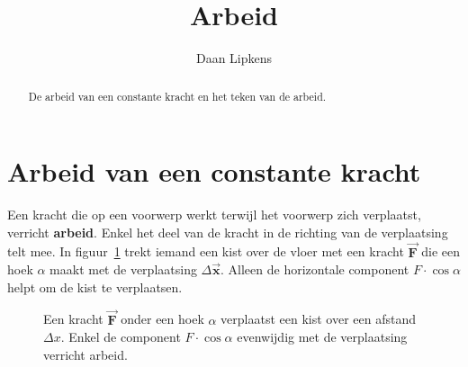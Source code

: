 \documentclass{ximera}
\title{Arbeid}
\author{Daan Lipkens}
\begin{document}
\begin{abstract}
    De arbeid van een constante kracht en het teken van de arbeid.
\end{abstract}
\maketitle
\label{app:arbeid}

\section{Arbeid van een constante kracht}\label{sec:arbeid}
Een kracht die op een voorwerp werkt terwijl het voorwerp zich verplaatst, verricht \textbf{arbeid}. Enkel het deel van de kracht in de richting van de verplaatsing telt mee. In figuur~\ref{fig:arbeid_hoek} trekt iemand een kist over de vloer met een kracht $\vec{\mathbf{F}}$ die een hoek $\alpha$ maakt met de verplaatsing $\Delta \vec{\mathbf{x}}$. Alleen de horizontale component $F \cdot \cos \alpha$ helpt om de kist te verplaatsen.

\begin{figure}[h]
    \captionsetup{width=0.85\textwidth}
    \begin{center}
    \end{center}
    \caption{Een kracht $\vec{\mathbf{F}}$ onder een hoek $\alpha$ verplaatst een kist over een afstand $\Delta x$. Enkel de component $F \cdot \cos \alpha$ evenwijdig met de verplaatsing verricht arbeid.}
    \label{fig:arbeid_hoek}
\end{figure}
\end{document}
